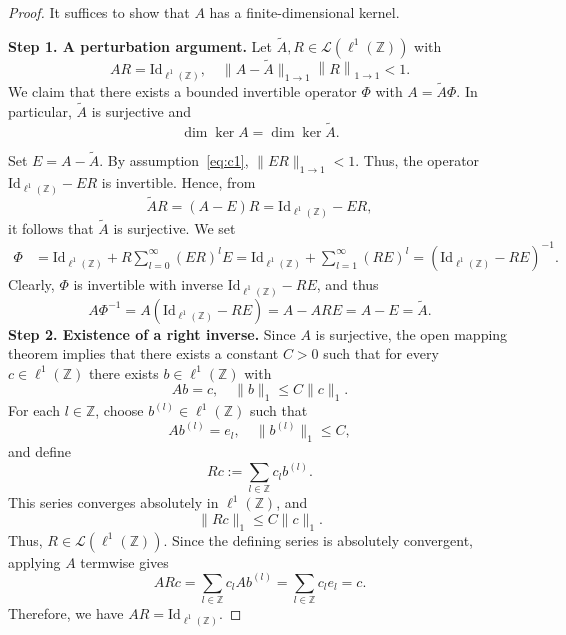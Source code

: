 \documentclass[reqno,a4paper,12pt]{amsart}
\numberwithin{equation}{section}
\def\Z{{\mathbb Z}}
\newcommand\1{\mathds{1}}
\newcommand{\norm}[1]{\left\lVert #1 \right\rVert}
\begin{document}
\begin{proof}
It suffices to show that $A$ has a finite-dimensional kernel.

\textbf{Step 1. A perturbation argument.}
Let $\tilde{A},R\in \mathcal{L}(\ell^1(\Z))$ with
\begin{equation} \label{eq:c1}
    AR=\mathrm{Id}_{\ell^1(\Z)},\quad \|A-\tilde{A}\|_{1\to 1} \norm{R}_{1\to 1} <1.
\end{equation}
We claim that there exists a bounded invertible operator $\Phi$ with $A=\tilde{A}\Phi$. In particular, $\tilde{A}$ is surjective and
\begin{equation}\label{eq:same_kernel}
    \dim \ker A= \dim\ker \tilde{A} .
\end{equation}

Set $E=A-\tilde{A}$. By assumption~\eqref{eq:c1}, $\|ER\|_{1\to 1}<1$. 
Thus, the operator $\mathrm{Id}_{\ell^1(\Z)}- ER$ is invertible. Hence, from 
\begin{equation}
    \tilde{A}R = (A- E)R =\mathrm{Id}_{\ell^1(\Z)} -  ER,
\end{equation}
it follows that $\tilde{A}$ is surjective.
We set 
\begin{align}
    \Phi & = \mathrm{Id}_{\ell^1(\Z)} +R\sum\limits_{l=0}^\infty (ER)^l E
     = \mathrm{Id}_{\ell^1(\Z)} +\sum\limits_{l=1}^\infty (RE)^l = (\mathrm{Id}_{\ell^1(\Z)} -RE)^{-1}.
\end{align}
Clearly, $\Phi$ is invertible with inverse $\mathrm{Id}_{\ell^1(\Z)}
-RE$, and thus 
\begin{equation}
    A\Phi^{-1} = A(\mathrm{Id}_{\ell^1(\Z)} -RE) = A- ARE = A-E = \tilde{A}.
\end{equation}
\textbf{Step 2. Existence of a right inverse. }
Since $A$ is surjective, the open mapping theorem implies that there exists a constant
$C>0$ such that for every $c\in {\ell^1(\Z)}$ there exists $b\in {\ell^1(\Z)}$ with
$$
Ab=c,
\quad
\|b\|_1\leq C\|c\|_1 .
$$
For each $l\in\mathbb Z$, choose $b^{(l)}\in {\ell^1(\Z)}$ such that
$$
Ab^{(l)}=e_l,
\quad
\|b^{(l)}\|_1\leq C,
$$
and define
$$
Rc:=\sum_{l\in\mathbb Z}c_l b^{(l)} .
$$
This series converges absolutely in ${\ell^1(\Z)}$, and
$$
\|Rc\|_1\leq C\|c\|_1 .
$$
Thus, $R\in\mathcal L({\ell^1(\Z)})$. Since the defining series is absolutely
convergent, applying $A$ termwise gives
$$
ARc=\sum_{l\in\mathbb Z}c_lAb^{(l)}
=\sum_{l\in\mathbb Z}c_le_l
=c.
$$
Therefore, we have $AR=\mathrm{Id}_{\ell^1(\Z)}$.


\end{proof}
\end{document}
